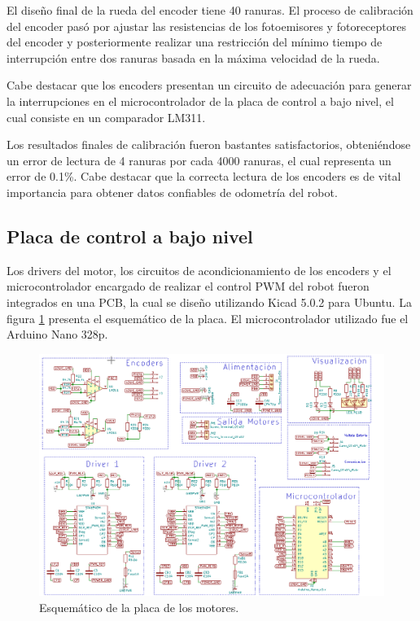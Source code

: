 El diseño final de la rueda del encoder tiene 40 ranuras. El proceso de calibración del encoder pasó por ajustar las resistencias de los fotoemisores y fotoreceptores del encoder y posteriormente realizar una restricción del mínimo tiempo de interrupción entre dos ranuras basada en la máxima velocidad de la rueda.

Cabe destacar que los encoders presentan un circuito de adecuación para generar la interrupciones en el microcontrolador de la placa de control a bajo nivel, el cual consiste en un comparador LM311.

Los resultados finales de calibración fueron bastantes satisfactorios, obteniéndose un error de lectura de 4 ranuras por cada 4000 ranuras, el cual representa un error de 0.1\%.
Cabe destacar que la correcta lectura de los encoders es de vital importancia para obtener datos confiables de odometría del robot.

\subsection{Placa de control a bajo nivel}
Los drivers del motor, los circuitos de acondicionamiento de los encoders y el microcontrolador encargado de realizar el control PWM del robot fueron integrados en una PCB, la cual se diseño utilizando Kicad 5.0.2 para Ubuntu. La figura \ref{imagen:PlacaMotores} presenta el esquemático de la placa. El microcontrolador utilizado fue el Arduino Nano 328p.


\begin{figure}[H]
	\centering		\includegraphics[width=1.0\linewidth]{imagenes/prototipo/Placa/PlacaMotores}
	\caption{Esquemático de la placa de los motores.}
	\label{imagen:PlacaMotores}
\end{figure}


